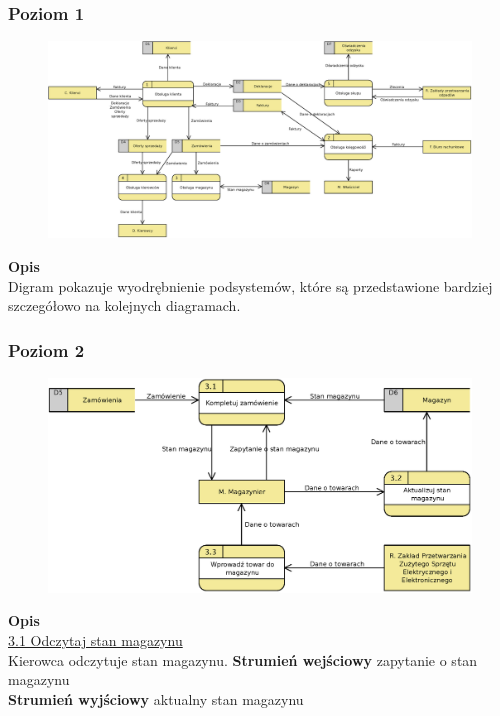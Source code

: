 \begin{landscape}
	\subsubsection{Poziom 1}
		\begin{figure}[H]
			\centering
			\centerline{\includegraphics[width=29cm]{img/DFD/1-level.eps}}
		\end{figure}
\end{landscape}

	\textbf{Opis}\\
	Digram pokazuje wyodrębnienie podsystemów, które są przedstawione bardziej szczegółowo na kolejnych diagramach.

\subsubsection{Poziom 2}
	\begin{figure}[H]
		\centering
		\includegraphics[width=\textwidth]{img/DFD/2-level-magazyn.eps}
	\end{figure}

	\textbf{Opis} \\
	\underline{3.1 Odczytaj stan magazynu}\\
	Kierowca odczytuje stan magazynu.
	\textbf{Strumień wejściowy} zapytanie o stan magazynu\\
	\textbf{Strumień wyjściowy} aktualny stan magazynu\\

